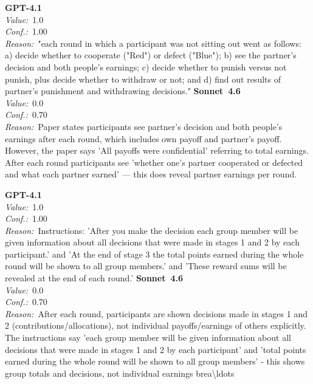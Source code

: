 \documentclass[11pt,a4paper]{article}
\begin{document}
\begin{tcolorbox}[
  title={\textbf{CONFIG\_showOtherSummaries} \textbar{} DOI: 10.1016\_j.socec.2023.102050 \textbar{} Cond.~0},
  colback=blue!3!white,
  colframe=blue!45!black,
  fonttitle=\small\sffamily,
  sidebyside,
  sidebyside align=top seam,
  lower separated=false,
  breakable,
  before upper={\small},
  before lower={\small},
]
\textbf{GPT-4.1}\\[2pt]
\textit{Value:}~1.0\\[3pt]
\textit{Conf.:}~1.00\\[3pt]
\textit{Reason:}~"each round in which a participant was not sitting out went as follows: a) decide whether to cooperate ("Red") or defect ("Blue"); b) see the partner's decision and both people's earnings; c) decide whether to punish versus not punish, plus decide whether to withdraw or not; and d) find out results of partner's punishment and withdrawing decisions."
\tcblower
\textbf{Sonnet~4.6}\\[2pt]
\textit{Value:}~0.0\\[3pt]
\textit{Conf.:}~0.70\\[3pt]
\textit{Reason:}~Paper states participants see partner's decision and both people's earnings after each round, which includes own payoff and partner's payoff. However, the paper says 'All payoffs were confidential' referring to total earnings. After each round participants see 'whether one's partner cooperated or defected and what each partner earned' --- this does reveal partner earnings per round.
\end{tcolorbox}

\begin{tcolorbox}[
  title={\textbf{CONFIG\_showOtherSummaries} \textbar{} DOI: 10.1007\_s11238-021-09864-7 \textbar{} Cond.~0},
  colback=blue!3!white,
  colframe=blue!45!black,
  fonttitle=\small\sffamily,
  sidebyside,
  sidebyside align=top seam,
  lower separated=false,
  breakable,
  before upper={\small},
  before lower={\small},
]
\textbf{GPT-4.1}\\[2pt]
\textit{Value:}~1.0\\[3pt]
\textit{Conf.:}~1.00\\[3pt]
\textit{Reason:}~Instructions: 'After you make the decision each group member will be given information about all decisions that were made in stages 1 and 2 by each participant.' and 'At the end of stage 3 the total points earned during the whole round will be shown to all group members.' and 'These reward sums will be revealed at the end of each round.'
\tcblower
\textbf{Sonnet~4.6}\\[2pt]
\textit{Value:}~0.0\\[3pt]
\textit{Conf.:}~0.70\\[3pt]
\textit{Reason:}~After each round, participants are shown decisions made in stages 1 and 2 (contributions/allocations), not individual payoffs/earnings of others explicitly. The instructions say 'each group member will be given information about all decisions that were made in stages 1 and 2 by each participant' and 'total points earned during the whole round will be shown to all group members' - this shows group totals and decisions, not individual earnings brea\textbackslash{}ldots
\end{tcolorbox}
\end{document}
